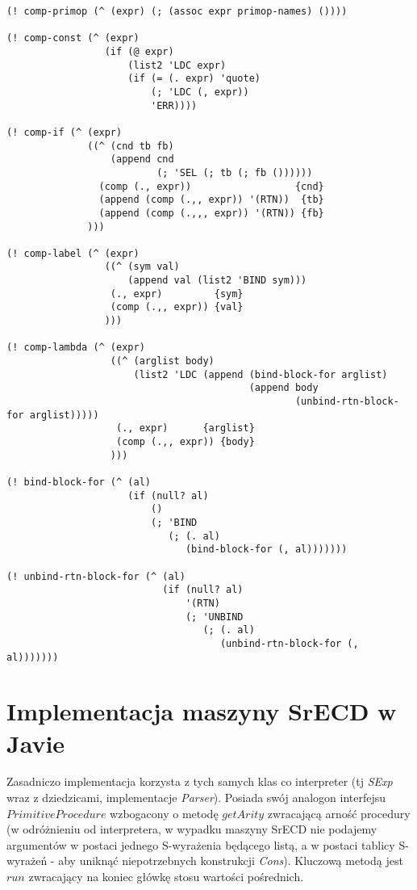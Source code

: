 \documentclass[a4paper]{article}
\begin{document}
\begin{verbatim}
(! comp-primop (^ (expr) (; (assoc expr primop-names) ())))

(! comp-const (^ (expr)
                 (if (@ expr)
                     (list2 'LDC expr)
                     (if (= (. expr) 'quote)
                         (; 'LDC (, expr))
                         'ERR))))

(! comp-if (^ (expr)
              ((^ (cnd tb fb)
                  (append cnd
                          (; 'SEL (; tb (; fb ())))))
                (comp (., expr))                  {cnd}
                (append (comp (.,, expr)) '(RTN))  {tb} 
                (append (comp (.,,, expr)) '(RTN)) {fb} 
              )))

(! comp-label (^ (expr)
                 ((^ (sym val)
                     (append val (list2 'BIND sym)))
                  (., expr)         {sym}
                  (comp (.,, expr)) {val}
                 )))

(! comp-lambda (^ (expr)
                  ((^ (arglist body)
                      (list2 'LDC (append (bind-block-for arglist)
                                          (append body
                                                  (unbind-rtn-block-for arglist)))))
                   (., expr)      {arglist}
                   (comp (.,, expr)) {body}
                  )))

(! bind-block-for (^ (al)
                     (if (null? al)
                         ()
                         (; 'BIND
                            (; (. al)
                               (bind-block-for (, al)))))))

(! unbind-rtn-block-for (^ (al)
                           (if (null? al)
                               '(RTN)
                               (; 'UNBIND
                                  (; (. al)
                                     (unbind-rtn-block-for (, al)))))))

\end{verbatim}
\normalsize


\section{Implementacja maszyny SrECD w Javie}

Zasadniczo implementacja korzysta z tych samych klas co interpreter (tj \emph{SExp} wraz z dziedzicami,
implementacje \emph{Parser}). Posiada swój analogon interfejsu $PrimitiveProcedure$ wzbogacony o metodę
$getArity$ zwracającą arność procedury (w odróżnieniu od interpretera, w wypadku maszyny SrECD nie
podajemy argumentów w postaci jednego S-wyrażenia będącego listą, a w postaci tablicy S-wyrażeń - aby
uniknąć niepotrzebnych konstrukcji \emph{Cons}).
Kluczową metodą jest $run$ zwracający na koniec główkę stosu wartości pośrednich.
\end{document}
